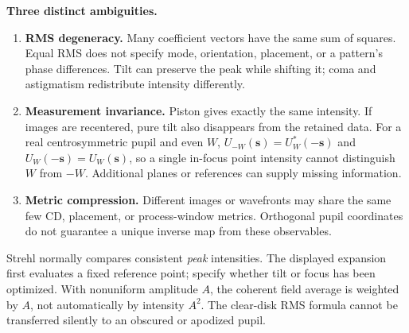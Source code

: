 \textbf{Three distinct ambiguities.}
\begin{enumerate}
\item \textbf{RMS degeneracy.} Many coefficient vectors have the same sum of squares. Equal RMS does not specify mode, orientation, placement, or a pattern's phase differences. Tilt can preserve the peak while shifting it; coma and astigmatism redistribute intensity differently.
\item \textbf{Measurement invariance.} Piston gives exactly the same intensity. If images are recentered, pure tilt also disappears from the retained data. For a real centrosymmetric pupil and even $W$, $U_{-W}(\mathbf s)=U_W^*(-\mathbf s)$ and $U_W(-\mathbf s)=U_W(\mathbf s)$, so a single in-focus point intensity cannot distinguish $W$ from $-W$. Additional planes or references can supply missing information.
\item \textbf{Metric compression.} Different images or wavefronts may share the same few CD, placement, or process-window metrics. Orthogonal pupil coordinates do not guarantee a unique inverse map from these observables.
\end{enumerate}
Strehl normally compares consistent \emph{peak} intensities. The displayed expansion first evaluates a fixed reference point; specify whether tilt or focus has been optimized. With nonuniform amplitude $A$, the coherent field average is weighted by $A$, not automatically by intensity $A^2$. The clear-disk RMS formula cannot be transferred silently to an obscured or apodized pupil.

